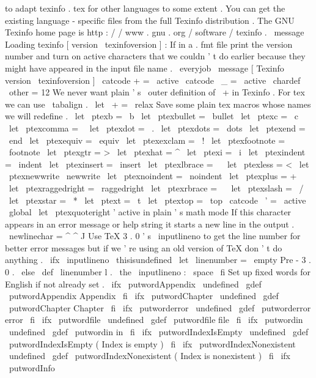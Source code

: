 to
adapt
texinfo
.
tex
for
other
languages
to
some
%
extent
.
You
can
get
the
existing
language
-
specific
files
from
the
%
full
Texinfo
distribution
.
%
%
The
GNU
Texinfo
home
page
is
http
:
/
/
www
.
gnu
.
org
/
software
/
texinfo
.
\
message
{
Loading
texinfo
[
version
\
texinfoversion
]
:
}
%
If
in
a
.
fmt
file
print
the
version
number
%
and
turn
on
active
characters
that
we
couldn
'
t
do
earlier
because
%
they
might
have
appeared
in
the
input
file
name
.
\
everyjob
{
\
message
{
[
Texinfo
version
\
texinfoversion
]
}
%
\
catcode
+
=
\
active
\
catcode
\
_
=
\
active
}
\
chardef
\
other
=
12
%
We
never
want
plain
'
s
\
outer
definition
of
\
+
in
Texinfo
.
%
For
tex
we
can
use
\
tabalign
.
\
let
\
+
=
\
relax
%
Save
some
plain
tex
macros
whose
names
we
will
redefine
.
\
let
\
ptexb
=
\
b
\
let
\
ptexbullet
=
\
bullet
\
let
\
ptexc
=
\
c
\
let
\
ptexcomma
=
\
\
let
\
ptexdot
=
\
.
\
let
\
ptexdots
=
\
dots
\
let
\
ptexend
=
\
end
\
let
\
ptexequiv
=
\
equiv
\
let
\
ptexexclam
=
\
!
\
let
\
ptexfootnote
=
\
footnote
\
let
\
ptexgtr
=
>
\
let
\
ptexhat
=
^
\
let
\
ptexi
=
\
i
\
let
\
ptexindent
=
\
indent
\
let
\
ptexinsert
=
\
insert
\
let
\
ptexlbrace
=
\
{
\
let
\
ptexless
=
<
\
let
\
ptexnewwrite
\
newwrite
\
let
\
ptexnoindent
=
\
noindent
\
let
\
ptexplus
=
+
\
let
\
ptexraggedright
=
\
raggedright
\
let
\
ptexrbrace
=
\
}
\
let
\
ptexslash
=
\
/
\
let
\
ptexstar
=
\
*
\
let
\
ptext
=
\
t
\
let
\
ptextop
=
\
top
{
\
catcode
\
'
=
\
active
\
global
\
let
\
ptexquoteright
'
}
%
active
in
plain
'
s
math
mode
%
If
this
character
appears
in
an
error
message
or
help
string
it
%
starts
a
new
line
in
the
output
.
\
newlinechar
=
^
^
J
%
Use
TeX
3
.
0
'
s
\
inputlineno
to
get
the
line
number
for
better
error
%
messages
but
if
we
'
re
using
an
old
version
of
TeX
don
'
t
do
anything
.
%
\
ifx
\
inputlineno
\
thisisundefined
\
let
\
linenumber
=
\
empty
%
Pre
-
3
.
0
.
\
else
\
def
\
linenumber
{
l
.
\
the
\
inputlineno
:
\
space
}
\
fi
%
Set
up
fixed
words
for
English
if
not
already
set
.
\
ifx
\
putwordAppendix
\
undefined
\
gdef
\
putwordAppendix
{
Appendix
}
\
fi
\
ifx
\
putwordChapter
\
undefined
\
gdef
\
putwordChapter
{
Chapter
}
\
fi
\
ifx
\
putworderror
\
undefined
\
gdef
\
putworderror
{
error
}
\
fi
\
ifx
\
putwordfile
\
undefined
\
gdef
\
putwordfile
{
file
}
\
fi
\
ifx
\
putwordin
\
undefined
\
gdef
\
putwordin
{
in
}
\
fi
\
ifx
\
putwordIndexIsEmpty
\
undefined
\
gdef
\
putwordIndexIsEmpty
{
(
Index
is
empty
)
}
\
fi
\
ifx
\
putwordIndexNonexistent
\
undefined
\
gdef
\
putwordIndexNonexistent
{
(
Index
is
nonexistent
)
}
\
fi
\
ifx
\
putwordInfo
